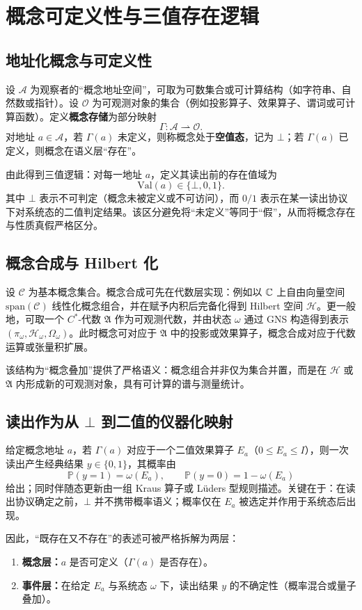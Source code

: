 \section{概念可定义性与三值存在逻辑}

\subsection{地址化概念与可定义性}

设 $\mathcal{A}$ 为观察者的“概念地址空间”，可取为可数集合或可计算结构（如字符串、自然数或指针）。设 $\mathcal{O}$ 为可观测对象的集合（例如投影算子、效果算子、谓词或可计算函数）。定义\textbf{概念存储}为部分映射
\[
\Gamma:\mathcal{A}\rightharpoonup \mathcal{O}.
\]
对地址 $a\in\mathcal{A}$，若 $\Gamma(a)$ 未定义，则称概念处于\textbf{空值态}，记为 $\bot$；若 $\Gamma(a)$ 已定义，则概念在语义层“存在”。

由此得到三值逻辑：对每一地址 $a$，定义其读出前的存在值域为
\[
\mathrm{Val}(a)\in\{\bot,0,1\}.
\]
其中 $\bot$ 表示不可判定（概念未被定义或不可访问），而 $0/1$ 表示在某一读出协议下对系统态的二值判定结果。该区分避免将“未定义”等同于“假”，从而将概念存在与性质真假严格区分。

\subsection{概念合成与 Hilbert 化}

设 $\mathcal{C}$ 为基本概念集合。概念合成可先在代数层实现：例如以 $\mathbb{C}$ 上自由向量空间 $\mathrm{span}(\mathcal{C})$ 线性化概念组合，并在赋予内积后完备化得到 Hilbert 空间 $\mathcal{H}$。更一般地，可取一个 $C^*$-代数 $\mathfrak{A}$ 作为可观测代数，并由状态 $\omega$ 通过 GNS 构造得到表示 $(\pi_\omega,\mathcal{H}_\omega,\Omega_\omega)$。此时概念可对应于 $\mathfrak{A}$ 中的投影或效果算子，概念合成对应于代数运算或张量积扩展。

该结构为“概念叠加”提供了严格语义：概念组合并非仅为集合并置，而是在 $\mathcal{H}$ 或 $\mathfrak{A}$ 内形成新的可观测对象，具有可计算的谱与测量统计。

\subsection{读出作为从 \texorpdfstring{$\bot$}{bottom} 到二值的仪器化映射}

给定概念地址 $a$，若 $\Gamma(a)$ 对应于一个二值效果算子 $E_a$（$0\le E_a\le I$），则一次读出产生经典结果 $y\in\{0,1\}$，其概率由
\[
\mathbb{P}(y=1)=\omega(E_a),\qquad \mathbb{P}(y=0)=1-\omega(E_a)
\]
给出；同时伴随态更新由一组 Kraus 算子或 Lüders 型规则描述。关键在于：在读出协议确定之前，$\bot$ 并不携带概率语义；概率仅在 $E_a$ 被选定并作用于系统态后出现。

因此，“既存在又不存在”的表述可被严格拆解为两层：
\begin{enumerate}
  \item \textbf{概念层：}$a$ 是否可定义（$\Gamma(a)$ 是否存在）。
  \item \textbf{事件层：}在给定 $E_a$ 与系统态 $\omega$ 下，读出结果 $y$ 的不确定性（概率混合或量子叠加）。
\end{enumerate}

